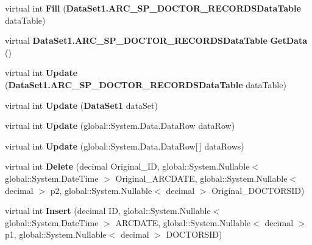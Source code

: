 \begin{CompactItemize}
\item 
virtual int \textbf{Fill} ({\bf DataSet1.ARC\_\-SP\_\-DOCTOR\_\-RECORDSDataTable} dataTable)\label{class_automatic_medical_system_1_1_data_set1_table_adapters_1_1_a_r_c___s_p___d_o_c_t_o_r___r_e_c_o_r_d_s_table_adapter_cb07907a47e1819c9abe86d2844a74d5}

\item 
virtual {\bf DataSet1.ARC\_\-SP\_\-DOCTOR\_\-RECORDSDataTable} \textbf{GetData} ()\label{class_automatic_medical_system_1_1_data_set1_table_adapters_1_1_a_r_c___s_p___d_o_c_t_o_r___r_e_c_o_r_d_s_table_adapter_e02441247de14048a7bc4a9a8ad5fc88}

\item 
virtual int \textbf{Update} ({\bf DataSet1.ARC\_\-SP\_\-DOCTOR\_\-RECORDSDataTable} dataTable)\label{class_automatic_medical_system_1_1_data_set1_table_adapters_1_1_a_r_c___s_p___d_o_c_t_o_r___r_e_c_o_r_d_s_table_adapter_21e72c07a23352fa1efdaa0838cb89b1}

\item 
virtual int \textbf{Update} ({\bf DataSet1} dataSet)\label{class_automatic_medical_system_1_1_data_set1_table_adapters_1_1_a_r_c___s_p___d_o_c_t_o_r___r_e_c_o_r_d_s_table_adapter_fbcc98c8295c9833e557a16f5141ff43}

\item 
virtual int \textbf{Update} (global::System.Data.DataRow dataRow)\label{class_automatic_medical_system_1_1_data_set1_table_adapters_1_1_a_r_c___s_p___d_o_c_t_o_r___r_e_c_o_r_d_s_table_adapter_b35a75d0c0b63ff0eefea3628bb231d7}

\item 
virtual int \textbf{Update} (global::System.Data.DataRow[$\,$] dataRows)\label{class_automatic_medical_system_1_1_data_set1_table_adapters_1_1_a_r_c___s_p___d_o_c_t_o_r___r_e_c_o_r_d_s_table_adapter_9ba9ab131191e5b8366b938c9dc013ff}

\item 
virtual int \textbf{Delete} (decimal Original\_\-ID, global::System.Nullable$<$ global::System.DateTime $>$ Original\_\-ARCDATE, global::System.Nullable$<$ decimal $>$ p2, global::System.Nullable$<$ decimal $>$ Original\_\-DOCTORSID)\label{class_automatic_medical_system_1_1_data_set1_table_adapters_1_1_a_r_c___s_p___d_o_c_t_o_r___r_e_c_o_r_d_s_table_adapter_5f65501d67b66f0ade0ea3f70cfb9c5c}

\item 
virtual int \textbf{Insert} (decimal ID, global::System.Nullable$<$ global::System.DateTime $>$ ARCDATE, global::System.Nullable$<$ decimal $>$ p1, global::System.Nullable$<$ decimal $>$ DOCTORSID)\label{class_automatic_medical_system_1_1_data_set1_table_adapters_1_1_a_r_c___s_p___d_o_c_t_o_r___r_e_c_o_r_d_s_table_adapter_3bf2a87a316607a77ae593ae9de27757}


\end{CompactItemize}
